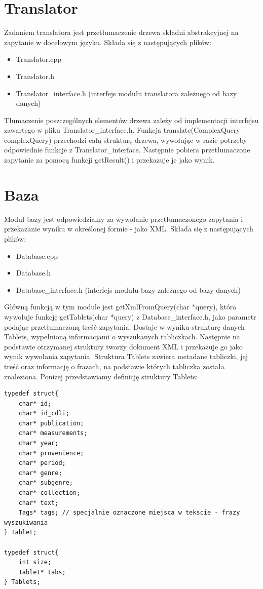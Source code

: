 \section{Translator}
Zadaniem translatora jest przetłumaczenie drzewa składni abstrakcyjnej na zapytanie w docelowym języku.
Składa się z następujących plików:
\begin {itemize}
 \item Translator.cpp
 \item Translator.h
 \item Translator\_interface.h (interfejs modułu translatora zależnego od bazy danych)
\end {itemize}

Tłumaczenie poszczególnych elementów drzewa zależy od implementacji interfejsu zawartego w pliku Translator\_interface.h. 
Funkcja translate(ComplexQuery complexQuery) przechodzi całą strukturę drzewa, wywołując w razie potrzeby odpowiednie funkcje z Translator\_interface.
Następnie pobiera przetłumaczone zapytanie za pomocą funkcji getResult() i przekazuje je jako wynik.

\section{Baza}
Moduł bazy jest odpowiedzialny za wywołanie przetłumaczonego zapytania i przekazanie wyniku w określonej formie - jako XML.
Składa się z następujących plików:
\begin {itemize}
 \item Database.cpp
 \item Database.h
 \item Database\_interface.h (interfejs modułu bazy zależnego od bazy danych)
\end {itemize}

Główną funkcją w tym module jest getXmlFromQuery(char *query), która
wywołuje funkcję getTablets(char *query) z Database\_interface.h, jako parametr podając przetłumaczoną treść zapytania. 
Dostaje w wyniku strukturę danych Tablets, wypełnioną informacjami o wyszukanych tabliczkach.
Następnie na podstawie otrzymanej struktury tworzy dokument XML i przekazuje go jako wynik wywołania zapytania.
\newline
Struktura Tablets zawiera metadane tabliczki, jej treść oraz informację o frazach, na podstawie których tabliczka została znaleziona. 
Poniżej przedstawiamy definicję struktury Tablets:
\begin{verbatim}
typedef struct{    
    char* id;
    char* id_cdli;
    char* publication;
    char* measurements;
    char* year;
    char* provenience;
    char* period;
    char* genre;
    char* subgenre;
    char* collection;
    char* text;
    Tags* tags; // specjalnie oznaczone miejsca w tekscie - frazy wyszukiwania
} Tablet;

typedef struct{
    int size;
    Tablet* tabs;
} Tablets;
\end{verbatim}

